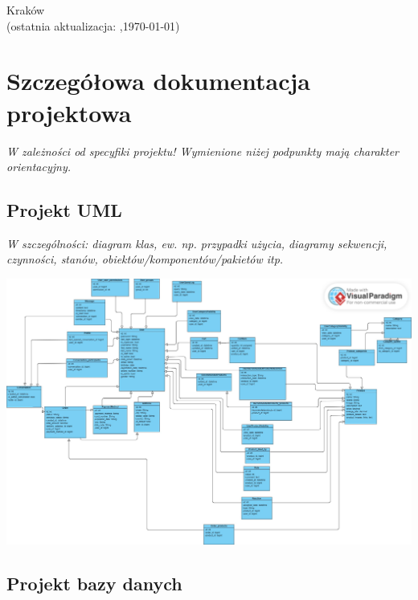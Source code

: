 \documentclass[12pt,a4paper,oneside]{article}
\theoremstyle{definition}
\numberwithin{equation}{section}
\begin{document}
\begin{titlepage}
\vspace*{\fill} %
\begin{center}
\large
Kraków \the\year\\
(ostatnia aktualizacja: \DTMcurrenttime,\;\today)
\end{center}
\end{titlepage}

\clearpage %

\tableofcontents


\newpage

\section{Szczegółowa dokumentacja projektowa}
\textit{W zależności od specyfiki projektu! Wymienione niżej podpunkty mają charakter orientacyjny.}
\subsection{Projekt UML}
\textit{W szczególności: diagram klas, ew. np. przypadki użycia, diagramy sekwencji, czynności, stanów, obiektów/komponentów/pakietów itp.}
\begin{center}
\centering \includegraphics[width=1.0\columnwidth]{images/UML.jpg}
\end{center}

\subsection{Projekt bazy danych}
\end{document}
